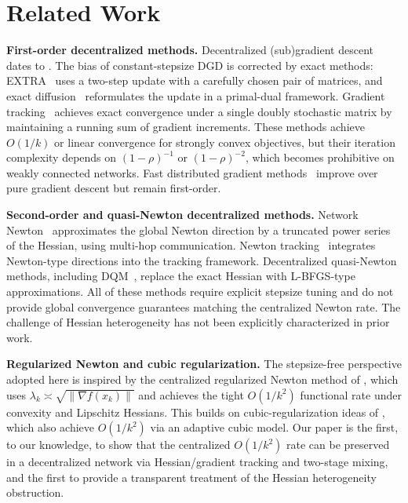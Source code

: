 \documentclass[11pt,a4paper]{article}
\def\cO{O}%
\newcommand{\cO}{\mathcal{O}}
\begin{document}
	\section{Related Work}
	
	\noindent\textbf{First-order decentralized methods.}
	Decentralized (sub)gradient descent dates to \citet{nedic2009subgradient}.
	The bias of constant-stepsize DGD is corrected by exact methods:
	EXTRA~\citep{shi2015extra} uses a two-step update with a carefully chosen pair of matrices,
	and exact diffusion~\citep{yuan2019exactdiffusion} reformulates the update in a primal-dual
	framework.
	Gradient tracking~\citep{nedic2017diging} achieves exact convergence
	under a single doubly stochastic matrix by maintaining a running sum of gradient increments.
	These methods achieve $\cO(1/k)$ or linear convergence for strongly convex objectives,
	but their iteration complexity depends on $(1-\rho)^{-1}$ or $(1-\rho)^{-2}$, which becomes
	prohibitive on weakly connected networks.
	Fast distributed gradient methods~\citep{jakovetic2014fast} improve over pure gradient descent
	but remain first-order.
	
	\noindent\textbf{Second-order and quasi-Newton decentralized methods.}
	Network Newton~\citep{mokhtari2015networknewton_arxiv} approximates the global Newton direction
	by a truncated power series of the Hessian, using multi-hop communication.
	Newton tracking~\citep{mokhtari2020newtontracking} integrates Newton-type directions into the
	tracking framework.
	Decentralized quasi-Newton methods, including DQM~\citep{eisen2017dqn}, replace the exact
	Hessian with L-BFGS-type approximations.
	All of these methods require explicit stepsize tuning and do not provide global convergence
	guarantees matching the centralized Newton rate.
	The challenge of Hessian heterogeneity has not been explicitly characterized in prior work.
	
	\noindent\textbf{Regularized Newton and cubic regularization.}
	The stepsize-free perspective adopted here is inspired by the centralized regularized Newton
	method of \citet{mishchenko2023rn}, which uses $\lambda_k\asymp\sqrt{\|\nabla f(x_k)\|}$
	and achieves the tight $\cO(1/k^2)$ functional rate under convexity and Lipschitz Hessians.
	This builds on cubic-regularization ideas of \citet{nesterov2006cubic,cartis2011arc},
	which also achieve $\cO(1/k^2)$ via an adaptive cubic model.
	Our paper is the first, to our knowledge, to show that the centralized $\cO(1/k^2)$
	rate can be preserved in a decentralized network via Hessian/gradient tracking and
	two-stage mixing, and the first to provide a transparent treatment of the Hessian
	heterogeneity obstruction.
	
\end{document}
